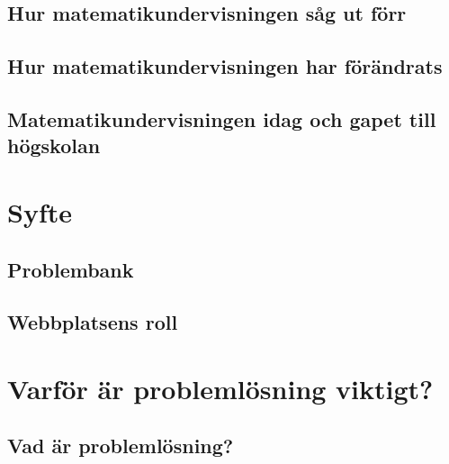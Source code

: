 \documentclass[11pt,a4paper]{article}
\begin{document}
    \subsection{Hur matematikundervisningen såg ut förr}
        \label{sec:MatteForr}
        
        
    \subsection{Hur matematikundervisningen har förändrats}
        \label{sec:Forandringar}
        
        
    \subsection{Matematikundervisningen idag och gapet till högskolan}
        
        
%        

\section{Syfte}
    
    
    \subsection{Problembank}
        
    
    \subsection{Webbplatsens roll}
        
\section{Varför är problemlösning viktigt?}
    \label{sec:Teori}
    
        
    \subsection{Vad är problemlösning?}
        \label{sec:problemdef}
        
        
\end{document}
